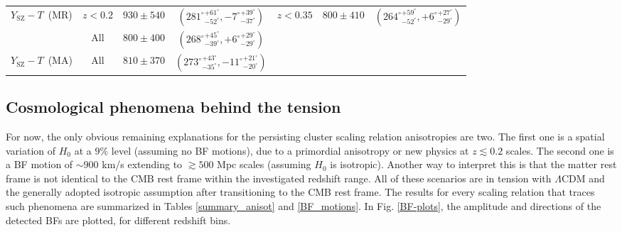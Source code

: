 \documentclass{aa}   %
\newcommand{\YT}{$Y_{\text{SZ}}-T$}
\begin{document}
\begin{table}[hbtp]
\begin{center}
\begin{tabular}{ c  c  c  c | c  c c }
\YT\ (MR)&  $z<0.2$ & $930\pm 540$ & $({281^{\circ}}^{+61^{\circ}}_{-52^{\circ}},{-7^{\circ}}^{+39^{\circ}}_{-37^{\circ}})$ & $z<0.35$ & $800\pm 410$  & $({264^{\circ}}^{+59^{\circ}}_{-52^{\circ}},{+6^{\circ}}^{+27^{\circ}}_{-29^{\circ}})$ \\ 
&  All & $800\pm 400$ & $({268^{\circ}}^{+45^{\circ}}_{-39^{\circ}},{+6^{\circ}}^{+29^{\circ}}_{-29^{\circ}})$ & & &\\ 
\YT\ (MA)&  All & $810\pm 370$ & $({273^{\circ}}^{+43^{\circ}}_{-35^{\circ}},{-11^{\circ}}^{+21^{\circ}}_{-20^{\circ}})$ & &  & \\ 

\hline
 
\end{tabular}
\end{center}
\end{table}
 
 \subsection{Cosmological phenomena behind the tension}
 
For now, the only obvious remaining explanations for the persisting cluster scaling relation anisotropies are two. The first one is a spatial variation of $H_0$ at a $9\%$ level (assuming no BF motions), due to a primordial anisotropy or new physics at $z\lesssim 0.2$ scales. The second one is a BF motion of $\sim 900$ km/s extending to $\gtrsim 500$ Mpc scales (assuming $H_0$ is isotropic). Another way to interpret this is that the matter rest frame is not identical to the CMB rest frame within the investigated redshift range. All of these scenarios are in tension with $\Lambda$CDM and the generally adopted isotropic assumption after transitioning to the CMB rest frame. The results for every scaling relation that traces such phenomena are summarized in Tables \ref{summary_anisot} and \ref{BF_motions}. In Fig. \ref{BF-plots}, the amplitude and directions of the detected BFs are plotted, for different redshift bins. 
\end{document}
